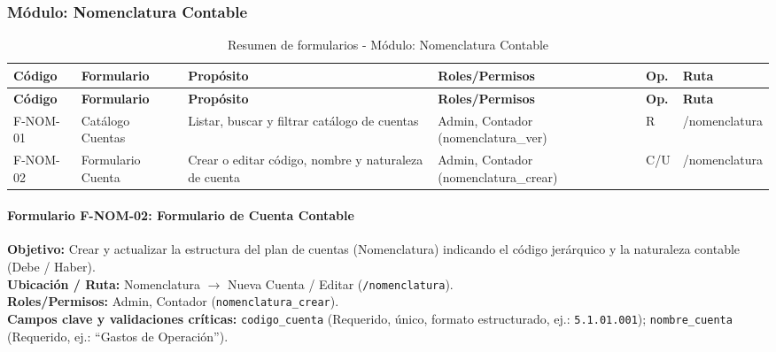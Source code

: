 \subsubsection{Módulo: Nomenclatura Contable}

{
\small
{}
\setlength{\parindent}{0pt}
\begin{xltabular}{\linewidth}{
    >{\raggedright\arraybackslash}p{1.8cm} 
    >{\raggedright\arraybackslash}p{2.8cm} 
    >{\raggedright\arraybackslash}X 
    >{\raggedright\arraybackslash}p{2.5cm} 
    >{\centering\arraybackslash}p{0.8cm} 
    >{\raggedright\arraybackslash}p{2.0cm}
}

    \caption{Resumen de formularios - Módulo: Nomenclatura Contable} \label{tab:cap4_nomenclatura_resumen} \\
    \toprule
    \textbf{Código} & \textbf{Formulario} & \textbf{Propósito} & \textbf{Roles/Permisos} & \textbf{Op.} & \textbf{Ruta} \\
    \midrule
    \endfirsthead

    \toprule
    \textbf{Código} & \textbf{Formulario} & \textbf{Propósito} & \textbf{Roles/Permisos} & \textbf{Op.} & \textbf{Ruta} \\
    \midrule
    \endhead

    \endfoot

\bottomrule
\endlastfoot

    F-NOM-01 & Catálogo Cuentas & Listar, buscar y filtrar catálogo de cuentas & Admin, Contador (\textrm{nomenclatura\_ver}) & R & \textrm{/nomenclatura} \\
    \addlinespace
    F-NOM-02 & Formulario Cuenta & Crear o editar código, nombre y naturaleza de cuenta & Admin, Contador (\textrm{nomenclatura\_crear}) & C/U & \textrm{/nomenclatura} \\
\end{xltabular}
}

\paragraph{Formulario F-NOM-02: Formulario de Cuenta Contable}
\noindent\textbf{Objetivo:} Crear y actualizar la estructura del plan de cuentas (Nomenclatura) indicando el código jerárquico y la naturaleza contable (Debe / Haber). \\[0.3em]
\textbf{Ubicación / Ruta:} Nomenclatura $\rightarrow$ Nueva Cuenta / Editar (\texttt{/nomenclatura}). \\[0.3em]
\textbf{Roles/Permisos:} Admin, Contador (\texttt{nomenclatura\_crear}). \\[0.3em]
\textbf{Campos clave y validaciones críticas:} \texttt{codigo\_cuenta} (Requerido, único, formato estructurado, ej.: \texttt{5.1.01.001}); \texttt{nombre\_cuenta} (Requerido, ej.: ``Gastos de Operación'').


